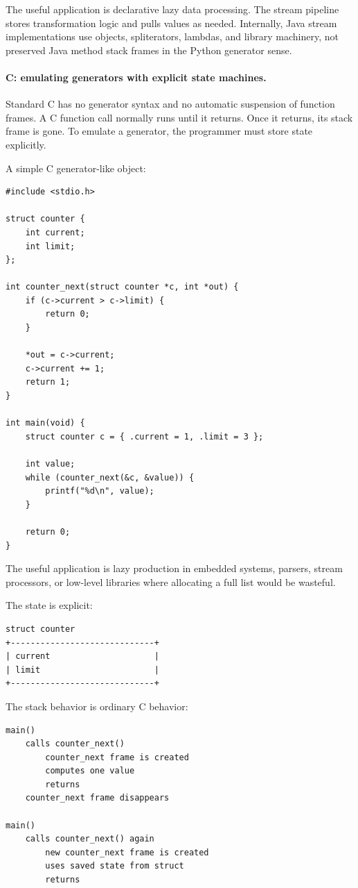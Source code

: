 The useful application is declarative lazy data processing. The stream pipeline stores transformation logic and pulls values as needed. Internally, Java stream implementations use objects, spliterators, lambdas, and library machinery, not preserved Java method stack frames in the Python generator sense.

\paragraph{C: emulating generators with explicit state machines.}

Standard C has no generator syntax and no automatic suspension of function frames. A C function call normally runs until it returns. Once it returns, its stack frame is gone. To emulate a generator, the programmer must store state explicitly.

A simple C generator-like object:

\begin{verbatim}
#include <stdio.h>

struct counter {
    int current;
    int limit;
};

int counter_next(struct counter *c, int *out) {
    if (c->current > c->limit) {
        return 0;
    }

    *out = c->current;
    c->current += 1;
    return 1;
}

int main(void) {
    struct counter c = { .current = 1, .limit = 3 };

    int value;
    while (counter_next(&c, &value)) {
        printf("%d\n", value);
    }

    return 0;
}
\end{verbatim}

The useful application is lazy production in embedded systems, parsers, stream processors, or low-level libraries where allocating a full list would be wasteful.

The state is explicit:

\begin{verbatim}
struct counter
+-----------------------------+
| current                     |
| limit                       |
+-----------------------------+
\end{verbatim}

The stack behavior is ordinary C behavior:

\begin{verbatim}
main()
    calls counter_next()
        counter_next frame is created
        computes one value
        returns
    counter_next frame disappears

main()
    calls counter_next() again
        new counter_next frame is created
        uses saved state from struct
        returns
\end{verbatim}

